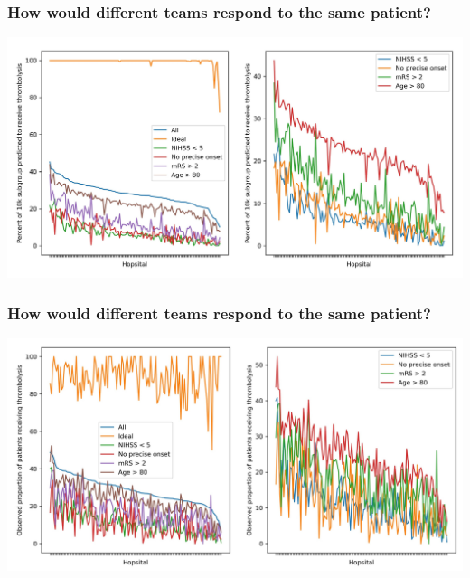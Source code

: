\documentclass{beamer}
\begin{document}

\begin{frame}
\frametitle{How would different teams respond to the same patient?}

    \begin{center}
    \includegraphics[width=1.0\textwidth]{./images/15_10k_subgroup.jpg}
    \end{center}

\end{frame}



\begin{frame}
\frametitle{How would different teams respond to the same patient?}

    \begin{center}
    \includegraphics[width=1.0\textwidth]{./images/15a_actual_subgroup.jpg}
    \end{center}

\end{frame}


\end{document}
